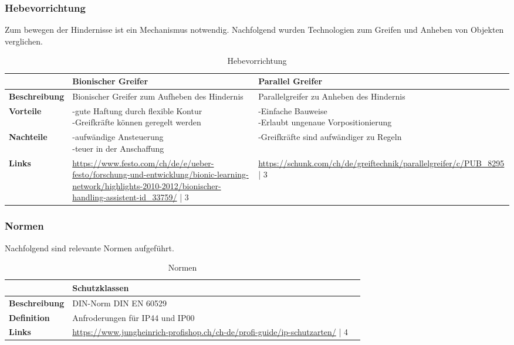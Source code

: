 \subsubsection{Hebevorrichtung}

Zum bewegen der Hindernisse ist ein Mechanismus notwendig. Nachfolgend wurden Technologien zum Greifen und Anheben von Objekten verglichen.

\begin{table}[H]
\centering
\small
\begin{tabularx}{\textwidth}{|l|X|X|}
\hline
\textbf{} & \textbf{Bionischer Greifer}&\textbf{Parallel Greifer}\\
  \hline
  \textbf{Beschreibung} & Bionischer Greifer zum Aufheben des Hindernis&   Parallelgreifer zu Anheben des Hindernis  \\
  \hline
  \textbf{Vorteile} & \makecell{-gute Haftung durch flexible Kontur \\-Greifkräfte können geregelt werden}&\makecell{-Einfache Bauweise\\ -Erlaubt ungenaue Vorpositionierung}  \\
  \hline
  \textbf{Nachteile}& \makecell{-aufwändige Ansteuerung \\ -teuer in der Anschaffung} &\makecell{-Greifkräfte sind aufwändiger zu Regeln \\ }     \\
  \hline
  \textbf{Links}  &   \url{https://www.festo.com/ch/de/e/ueber-festo/forschung-und-entwicklung/bionic-learning-network/highlights-2010-2012/bionischer-handling-assistent-id_33759/} | 3      &  \url{https://schunk.com/ch/de/greiftechnik/parallelgreifer/c/PUB_8295} | 3 \\
  \hline
\end{tabularx}
\caption{Hebevorrichtung}
\label{table:lifting-components}
\end{table}



\subsubsection{Normen}

Nachfolgend sind relevante Normen aufgeführt.

\begin{table}[H]
\centering
\small
\begin{tabularx}{\textwidth}{|l|X|X|}
\hline
\textbf{} & \textbf{Schutzklassen} & \textbf{}\\
  \hline
  \textbf{Beschreibung}&     DIN-Norm DIN EN 60529       &           \\
  \hline
  \textbf{Definition}&       Anfroderungen für IP44 und IP00      &           \\
  \hline
  \textbf{Links}&    \url{https://www.jungheinrich-profishop.ch/ch-de/profi-guide/ip-schutzarten/} | 4      &               \\
  \hline
\end{tabularx}
\caption{Normen}
\label{table:norms}
\end{table}




